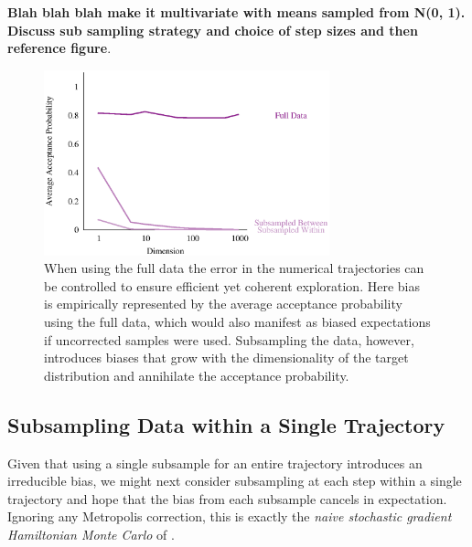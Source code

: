 \documentclass{article}
\begin{document}
\textbf{Blah blah blah make it multivariate with means sampled from N(0, 1).
Discuss sub sampling strategy and choice of step sizes and then reference figure}.

\begin{figure}
\centering
\includegraphics[width=3.25in]{multivariate.eps}
\caption{When using the full data the error in the numerical trajectories
can be controlled to ensure efficient yet coherent exploration.  Here
bias is empirically represented by the average acceptance probability 
using the full data, which would also manifest as biased expectations
if uncorrected samples were used.
Subsampling the data, however, introduces biases that grow with the
dimensionality of the target distribution and annihilate the acceptance
probability. }
\label{fig:multivariate}
\end{figure}

\subsection{Subsampling Data within a Single Trajectory}

Given that using a single subsample for an entire trajectory introduces an
irreducible bias, we might next consider subsampling at each step within
a single trajectory and hope that the bias from each subsample cancels
in expectation.  Ignoring any Metropolis correction, this is exactly the
\textit{naive stochastic gradient Hamiltonian Monte Carlo} of \cite{ChenEtAl:2014}.
\end{document}
